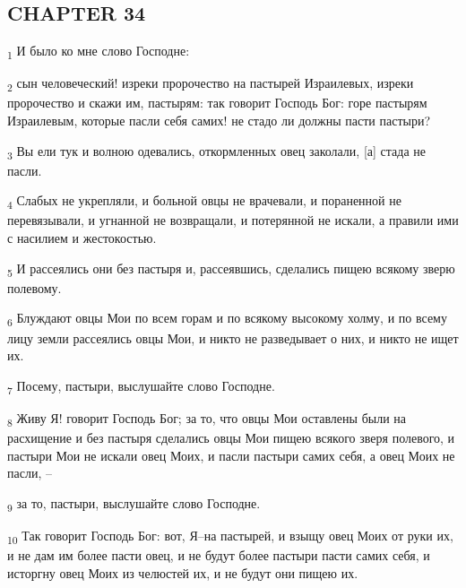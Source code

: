 \subsection{CHAPTER 34}
\begin{tcolorbox}
\textsubscript{1} И было ко мне слово Господне:
\end{tcolorbox}
\begin{tcolorbox}
\textsubscript{2} сын человеческий! изреки пророчество на пастырей Израилевых, изреки пророчество и скажи им, пастырям: так говорит Господь Бог: горе пастырям Израилевым, которые пасли себя самих! не стадо ли должны пасти пастыри?
\end{tcolorbox}
\begin{tcolorbox}
\textsubscript{3} Вы ели тук и волною одевались, откормленных овец заколали, [а] стада не пасли.
\end{tcolorbox}
\begin{tcolorbox}
\textsubscript{4} Слабых не укрепляли, и больной овцы не врачевали, и пораненной не перевязывали, и угнанной не возвращали, и потерянной не искали, а правили ими с насилием и жестокостью.
\end{tcolorbox}
\begin{tcolorbox}
\textsubscript{5} И рассеялись они без пастыря и, рассеявшись, сделались пищею всякому зверю полевому.
\end{tcolorbox}
\begin{tcolorbox}
\textsubscript{6} Блуждают овцы Мои по всем горам и по всякому высокому холму, и по всему лицу земли рассеялись овцы Мои, и никто не разведывает о них, и никто не ищет их.
\end{tcolorbox}
\begin{tcolorbox}
\textsubscript{7} Посему, пастыри, выслушайте слово Господне.
\end{tcolorbox}
\begin{tcolorbox}
\textsubscript{8} Живу Я! говорит Господь Бог; за то, что овцы Мои оставлены были на расхищение и без пастыря сделались овцы Мои пищею всякого зверя полевого, и пастыри Мои не искали овец Моих, и пасли пастыри самих себя, а овец Моих не пасли, --
\end{tcolorbox}
\begin{tcolorbox}
\textsubscript{9} за то, пастыри, выслушайте слово Господне.
\end{tcolorbox}
\begin{tcolorbox}
\textsubscript{10} Так говорит Господь Бог: вот, Я--на пастырей, и взыщу овец Моих от руки их, и не дам им более пасти овец, и не будут более пастыри пасти самих себя, и исторгну овец Моих из челюстей их, и не будут они пищею их.
\end{tcolorbox}
